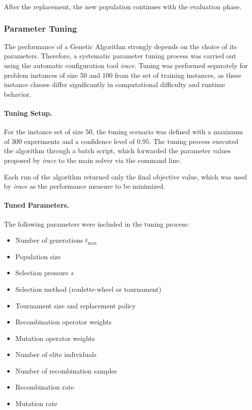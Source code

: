 \documentclass[12pt]{article}
\begin{document}
\bigskip

After the replacement, the new population continues with the evaluation phase. 

\subsubsection{Parameter Tuning}

The performance of a Genetic Algorithm strongly depends on the choice of its parameters. Therefore, a systematic parameter tuning process was carried out using the automatic configuration tool \textit{irace}. Tuning was performed separately for problem instances of size 50 and 100 from the set of training instances, as these instance classes differ significantly in computational difficulty and runtime behavior.

\paragraph{Tuning Setup.}
For the instance set of size 50, the tuning scenario was defined with a maximum of 300 experiments and a confidence level of $0.95$. The tuning process executed the algorithm through a batch script, which forwarded the parameter values proposed by \textit{irace} to the main solver via the command line.

Each run of the algorithm returned only the final objective value, which was used by \textit{irace} as the performance measure to be minimized.


\paragraph{Tuned Parameters.}
The following parameters were included in the tuning process:

\begin{itemize}
\item Number of generations $t_{\max}$
\item Population size
\item Selection pressure $s$
\item Selection method (roulette-wheel or tournament)
\item Tournament size and replacement policy
\item Recombination operator weights
\item Mutation operator weights
\item Number of elite individuals
\item Number of recombination samples
\item Recombination rate
\item Mutation rate
\end{itemize}
\end{document}
